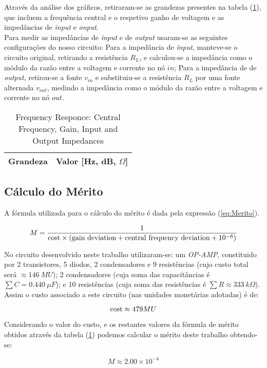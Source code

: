 Através da análise dos gráficos, retiraram-se as grandezas presentes na tabela (\ref{tab:SimValues}), que
incluem a frequência central e o respetivo ganho de voltagem e as impedâncias de \emph{input} e \emph{onput}.
\\
Para medir as impedâncias de \emph{input} e de \emph{output} usaram-se as seguintes configurações do nosso circuito:
Para a impedância de \emph{input}, manteve-se o circuito original, retirando a resistência $R_L$, e calculou-se
a impedância como o módulo da razão entre a voltagem e corrente no nó $in$; Para a impedância de de \emph{output},
retirou-se a fonte $v_{in}$ e substituiu-se a resistência $R_L$ por uma fonte alternada $v_{out}$, medindo a impedância
como o módulo da razão entre a voltagem e corrente no nó $out$.

\begin{table}[H]
    \centering
    \begin{tabular}{|l|r|}
    \hline    
    {\bf Grandeza} & {\bf Valor [Hz, dB, $\Omega$]} \\ \hline
    
    
    
    \end{tabular}
    \caption{Frequency Responce: Central Frequency, Gain, Input and Output Impedances}
    \label{tab:SimValues}
\end{table}


\subsection{Cálculo do Mérito}

A fórmula utilizada para o cálculo do mérito é dada pela expressão (\ref{eq:Merito}).

\begin{equation}
    M = \frac{1}{\textnormal{cost} \times (\textnormal{gain deviation} + \textnormal{central frequency deviation} + 10^{- 6})}
    \label{eq:Merito}
\end{equation}

No circuito desenvolvido neste trabalho utilizaram-se: um \emph{OP-AMP}, constituido por 2 transistores, 5 díodos, 2 condensadores e
9 resistências (cujo custo total será $\approx 146 \: MU$); 2 condensadores (cuja soma das capacitâncias é $\sum C = 0.440 \: \mu F$);
e 10 resistências (cuja soma das resistências é $\sum R \approx 333 \: k\Omega$).
\\
Assim o custo associado a este circuito (nas unidades monetárias adotadas) é de:

\begin{equation}
  \label{eq:Custo}
  \textnormal{cost} \approx 479 MU
\end{equation}

Considerando o valor do custo, e os restantes valores da fórmula de mérito obtidos através da tabela (\ref{tab:SimValues})
podemos calcular o mérito deste trabalho obtendo-se:

\begin{equation}
  \label{eq:ValorMerito}
  M \approx 2.00 \times 10^{- 4}
\end{equation}